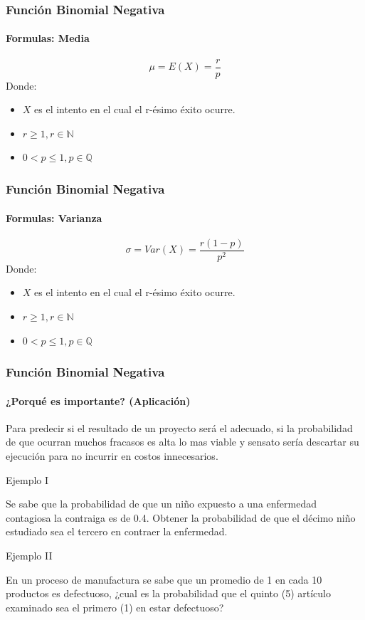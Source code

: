 \documentclass{beamer}
\begin{document}
	\begin{frame}
		\frametitle{Función Binomial Negativa}
		\framesubtitle{Formulas: Media}
		$$\mu = E(X) = \frac{r}{p}$$
		Donde:
		\begin{itemize}
		    \item $X$ es el intento en el cual el r-ésimo éxito ocurre.
		    \item $r \geq 1, r \in \mathbb{N}$
		    \item $0 < p \leq 1, p \in \mathbb{Q}$
		\end{itemize}
	\end{frame}
	\begin{frame}
		\frametitle{Función Binomial Negativa}
		\framesubtitle{Formulas: Varianza}
		$$\sigma = Var(X) = \frac{r(1-p)}{p^2}$$
		Donde:
		\begin{itemize}
		    \item $X$ es el intento en el cual el r-ésimo éxito ocurre.
		    \item $r \geq 1, r \in \mathbb{N}$
		    \item $0 < p \leq 1, p \in \mathbb{Q}$
		\end{itemize}
	\end{frame}
	\begin{frame}
		\frametitle{Función Binomial Negativa}
		\framesubtitle{¿Porqué es importante? (Aplicación)}
		Para predecir si el resultado de un proyecto será el adecuado, si la probabilidad de que ocurran muchos fracasos es alta lo mas viable y sensato sería descartar su ejecución para no incurrir en costos innecesarios.
	\end{frame}
	\begin{frame}{Ejemplo I}
	    \begin{examples}
            Se sabe que la probabilidad de que un niño expuesto a una enfermedad contagiosa la contraiga es de 0.4. Obtener la probabilidad de que el décimo niño estudiado sea el tercero en contraer la enfermedad.
        \end{examples}
	\end{frame}
	\begin{frame}{Ejemplo II}
	    \begin{examples}
            En un proceso de manufactura se sabe que un promedio de 1 en cada 10 productos es defectuoso, ¿cual es la probabilidad que el quinto (5) artículo examinado sea el primero (1) en estar defectuoso?
        \end{examples}
	\end{frame}
\end{document}
